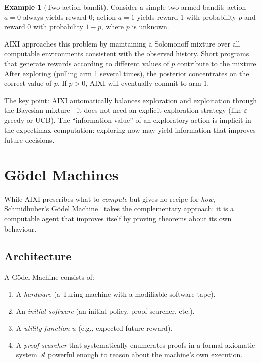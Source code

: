 \documentclass[11pt,a4paper]{article}
\theoremstyle{definition}
\newtheorem{example}[theorem]{Example}
\theoremstyle{remark}
\begin{document}
\begin{example}[Two-action bandit]\label{ex:bandit}
Consider a simple two-armed bandit: action $a=0$ always yields reward 0;
action $a=1$ yields reward 1 with probability $p$ and reward 0 with
probability $1-p$, where $p$ is unknown.

AIXI approaches this problem by maintaining a Solomonoff mixture over all
computable environments consistent with the observed history.  Short programs
that generate rewards according to different values of $p$ contribute to the
mixture.  After exploring (pulling arm 1 several times), the posterior
concentrates on the correct value of $p$.  If $p>0$, AIXI will eventually
commit to arm 1.

The key point: AIXI automatically balances exploration and exploitation
through the Bayesian mixture---it does not need an explicit exploration
strategy (like $\varepsilon$-greedy or UCB).  The ``information value'' of
an exploratory action is implicit in the expectimax computation: exploring
now may yield information that improves future decisions.
\end{example}

\section[Goedel Machines]{G\"odel Machines}\label{sec:godel}

While AIXI prescribes what to \emph{compute} but gives no recipe for
\emph{how}, Schmidhuber's G\"odel Machine~\cite{Schmidhuber2007} takes the
complementary approach: it is a computable agent that improves itself by
proving theorems about its own behaviour.

\subsection{Architecture}

A G\"odel Machine consists of:
\begin{enumerate}[nosep]
\item A \emph{hardware} (a Turing machine with a modifiable software tape).
\item An \emph{initial software} (an initial policy, proof searcher, etc.).
\item A \emph{utility function} $u$ (e.g., expected future reward).
\item A \emph{proof searcher} that systematically enumerates proofs in a
      formal axiomatic system $\mathcal{A}$ powerful enough to reason about
      the machine's own execution.
\end{enumerate}
\end{document}

